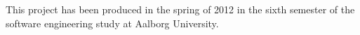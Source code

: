 This project has been produced in the spring of 2012 in the sixth semester of the software engineering study at Aalborg University.